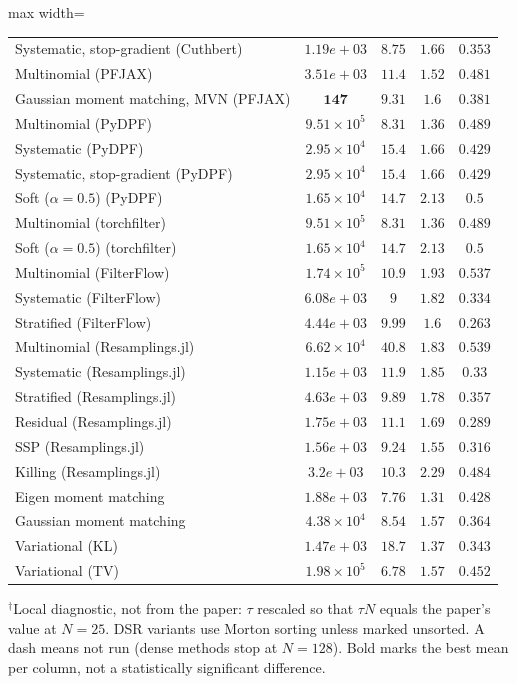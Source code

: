 \begin{table}[H]
\begin{adjustbox}{max width=\linewidth}
\begin{tabular}{lcccc}
Systematic, stop-gradient (Cuthbert) & $1.19e+03$ & $8.75$ & $1.66$ & $0.353$ \\
Multinomial (PFJAX) & $3.51e+03$ & $11.4$ & $1.52$ & $0.481$ \\
Gaussian moment matching, MVN (PFJAX) & $\mathbf{147}$ & $9.31$ & $1.6$ & $0.381$ \\
Multinomial (PyDPF) & $9.51\times10^{5}$ & $8.31$ & $1.36$ & $0.489$ \\
Systematic (PyDPF) & $2.95\times10^{4}$ & $15.4$ & $1.66$ & $0.429$ \\
Systematic, stop-gradient (PyDPF) & $2.95\times10^{4}$ & $15.4$ & $1.66$ & $0.429$ \\
Soft ($\alpha{=}0.5$) (PyDPF) & $1.65\times10^{4}$ & $14.7$ & $2.13$ & $0.5$ \\
Multinomial (torchfilter) & $9.51\times10^{5}$ & $8.31$ & $1.36$ & $0.489$ \\
Soft ($\alpha{=}0.5$) (torchfilter) & $1.65\times10^{4}$ & $14.7$ & $2.13$ & $0.5$ \\
Multinomial (FilterFlow) & $1.74\times10^{5}$ & $10.9$ & $1.93$ & $0.537$ \\
Systematic (FilterFlow) & $6.08e+03$ & $9$ & $1.82$ & $0.334$ \\
Stratified (FilterFlow) & $4.44e+03$ & $9.99$ & $1.6$ & $\mathbf{0.263}$ \\
Multinomial (Resamplings.jl) & $6.62\times10^{4}$ & $40.8$ & $1.83$ & $0.539$ \\
Systematic (Resamplings.jl) & $1.15e+03$ & $11.9$ & $1.85$ & $0.33$ \\
Stratified (Resamplings.jl) & $4.63e+03$ & $9.89$ & $1.78$ & $0.357$ \\
Residual (Resamplings.jl) & $1.75e+03$ & $11.1$ & $1.69$ & $0.289$ \\
SSP (Resamplings.jl) & $1.56e+03$ & $9.24$ & $1.55$ & $0.316$ \\
Killing (Resamplings.jl) & $3.2e+03$ & $10.3$ & $2.29$ & $0.484$ \\
Eigen moment matching & $1.88e+03$ & $7.76$ & $\mathbf{1.31}$ & $0.428$ \\
Gaussian moment matching & $4.38\times10^{4}$ & $8.54$ & $1.57$ & $0.364$ \\
Variational (KL) & $1.47e+03$ & $18.7$ & $1.37$ & $0.343$ \\
Variational (TV) & $1.98\times10^{5}$ & $\mathbf{6.78}$ & $1.57$ & $0.452$ \\
\bottomrule
\end{tabular}
\end{adjustbox}
\par\smallskip\parbox{0.95\linewidth}{\footnotesize $^\dagger$Local diagnostic, not from the paper: $\tau$ rescaled so that $\tau N$ equals the paper's value at $N{=}25$. DSR variants use Morton sorting unless marked unsorted. A dash means not run (dense methods stop at $N{=}128$). Bold marks the best mean per column, not a statistically significant difference.}
\end{table}


